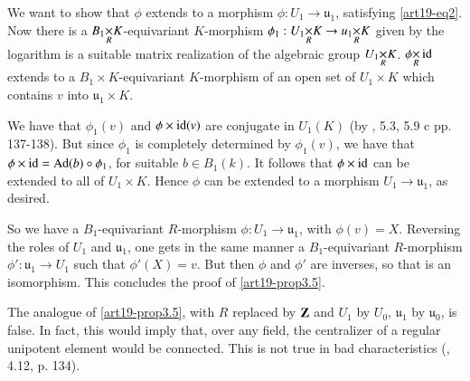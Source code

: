 We want to show that $\phi$ extends to a morphism $\phi:U_{1}\to \mathfrak{u}_{1}$, satisfying \eqref{art19-eq2}. Now there is a $\fprod{B_{1}}{K}{R}$-equivariant $K$-morphism $\phi_{1}:\fprod{U_{1}}{K}{R}\to \fprod{u_{1}}{K}{R}$ given by the logarithm is a suitable matrix realization of the algebraic group $\fprod{U_{1}}{K}{R}$. $\fprod{\phi}{\Iid}{R}$ extends to a $B_{1}\times K$-equivariant $K$-morphism of an open set of $U_{1}\times K$ which contains $v$ into $\mathfrak{u}_{1}\times K$.

We have that $\phi_{1}(v)$ and $\phi\times\operatorname{\mathrm{id}} (v)$ are conjugate in $U_{1}(K)$ (by \cite{art19-key14}, 5.3, 5.9 c pp. 137-138). But since $\phi_{1}$ is completely determined by $\phi_{1}(v)$, we have that $\phi\times \operatorname{\mathrm{id}}=\operatorname{\mathrm{Ad}}(b)\circ \phi_{1}$, for suitable $b\in B_{1}(k)$. It follows that $\phi\times \operatorname{\mathrm{id}}$ can be extended to all of $U_{1}\times K$. Hence $\phi$ can be extended to a morphism $U_{1}\to \mathfrak{u}_{1}$, as desired.

So we have a $B_{1}$-equivariant $R$-morphism $\phi:U_{1}\to \mathfrak{u}_{1}$, with $\phi(v)=X$. Reversing the roles of $U_{1}$ and $\mathfrak{u}_{1}$, one gets in the same manner a $B_{1}$-equivariant $R$-morphism $\phi':\mathfrak{u}_{1}\to U_{1}$ such that $\phi'(X)=v$. But then $\phi$ and $\phi'$ are inverses, so that is an isomorphism. This concludes the proof of \ref{art19-prop3.5}.

\begin{remark*}
The analogue of \ref{art19-prop3.5}, with $R$ replaced by $\mathbf{Z}$ and $U_{1}$ by $U_{0}$, $\mathfrak{u}_{1}$ by $\mathfrak{u}_{0}$, is false. In fact, this would imply that, over any field, the centralizer of a regular unipotent element would be connected. This is not true in bad characteristics (\cite{art19-key14}, 4.12, p. 134).
\end{remark*}

